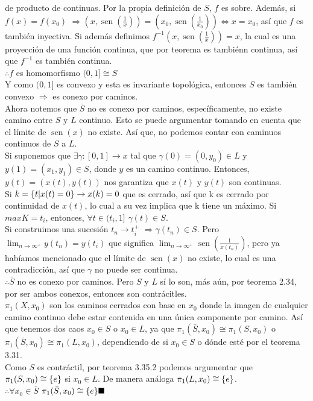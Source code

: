 \documentclass[11pt,a4paper,oneside]{report}
\theoremstyle{definition}
\theoremstyle{plain}
\theoremstyle{remark}
\DeclarePairedDelimiter{\conj}{\{}{\}}
\DeclareMathOperator{\sen}{sen}
\begin{document}
de producto de continuas. Por la propia definición de $S$, $f$ es sobre. Además, si $f(x)=f(x_0)$ 
$\Rightarrow (x,\sen(\frac{1}{x}))=(x_0,\sen(\frac{1}{x_0})) \iff x=x_0$, así que $f$ es también inyectiva.
Si además definimos $f^{-1}(x,\sen(\frac{1}{x}))=x$, la cual es una proyección de una función continua, que por teorema 
es tambiénn continua, así que $f^{-1}$ es también continua. \\
$\therefore f $ es homomorfismo $(0,1]\cong S$\\
Y como $(0,1]$ es convexo y esta es invariante topológica, entonces $S$ es también convexo $\Rightarrow$ es conexo por caminos.\\
Ahora notemos que $\bar{S}$ no es conexo por caminos, específicamente, no existe camino entre $S$ y $L$ continuo. 
Esto se puede argumentar tomando en cuenta que el límite de $\sen(x)$ no existe. Así que, no podemos contar con caminuos
continuos de $S$ a $L$. \\
Si suponemos que $\exists \gamma:[0,1]\rightarrow x$ tal que $\gamma(0)=(0,y_0)\in L$ y $y(1)=(x_1,y_1)\in S$,
donde $y$ es un camino continuo. Entonces, $y(t)=(x(t),y(t))$ nos garantiza que $x(t)$ y $y(t)$ son continuas.\\
Si $k=\conj{t|x(t)=0} \rightarrow x(k)={0}$ que es cerrado,
así que k es cerrado por continuidad de $x(t)$, lo cual a su vez implica que k tiene un máximo. Si $max K =t_i$,
entonces, $\forall t \in (t_i,1]$ $\gamma(t) \in S$. \\
Si construimos una sucesión $t_n\rightarrow t^+_i$ $\Rightarrow \gamma(t_n)\in S$. Pero $\lim_{n\rightarrow \infty^+}y(t_n)=y(t_i)$ 
que significa $\lim_{n\rightarrow \infty^+}\sen(\frac{1}{x(t_n)})$, pero ya habíamos mencionado que el límite de $\sen(x)$ no existe,
lo cual es una contradicción, así que $\gamma$ no puede ser continua. \\
$\therefore \bar{S}$ no es conexo por caminos. Pero $S$ y $L$ sí lo son, más aún, por teorema 2.34, por ser ambos 
conexos, entonces son contrácitles. \\
$\pi_1(X,x_0)$ son los caminos cerrados con base en $x_0$ donde la imagen de cualquier camino continuo debe estar 
contenida en una única componente por camino. Así que tenemos dos caos $x_0 \in S$ o $x_0 \in L$, ya que 
$\pi_1(\bar{S},x_0)\cong \pi_1(S,x_0)$ o $\pi_1(\bar{S},x_0)\cong \pi_1(L,x_0)$, dependiendo de si $x_0 \in S$ o 
dónde esté por el teorema 3.31. \\
Como $S$ es contráctil, por teorema 3.35.2 podemos argumentar que $\pi_1(S,x_0)\cong \conj{e}$ si $x_0 \in L$.
De manera análoga $\pi_1(L,x_0)\cong \conj{e}$.\\
$\therefore \forall x_0 \in \bar{S}$ $\pi_1(\bar{S},x_0)\cong \conj{e} \blacksquare$
\end{document}
